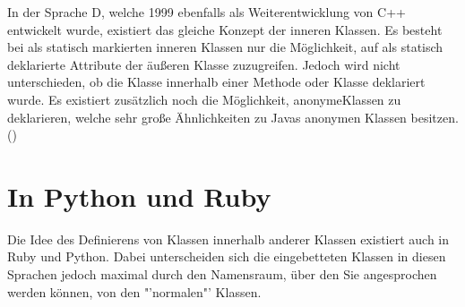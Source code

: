 In der Sprache D, welche 1999 ebenfalls als Weiterentwicklung von C++ entwickelt wurde, existiert das gleiche Konzept der inneren Klassen.
Es besteht bei als statisch markierten
inneren Klassen nur die Möglichkeit, auf als statisch deklarierte Attribute der äußeren
Klasse zuzugreifen. Jedoch wird nicht unterschieden, ob die Klasse innerhalb einer Methode oder Klasse deklariert wurde.
Es existiert zusätzlich noch die Möglichkeit, anonymeKlassen zu deklarieren, welche sehr große Ähnlichkeiten zu Javas anonymen Klassen besitzen.(\cite{D:langSpec})

\section{In Python und Ruby}

Die Idee des Definierens von Klassen innerhalb anderer Klassen existiert auch in Ruby und Python.
Dabei unterscheiden sich die eingebetteten Klassen in diesen Sprachen jedoch maximal durch den Namensraum,
über den Sie angesprochen werden können, von den "'normalen"' Klassen.
